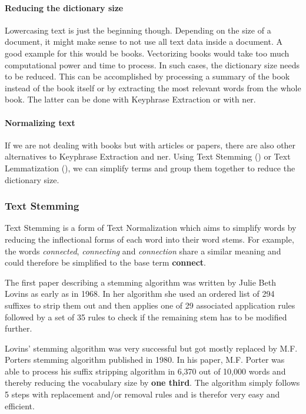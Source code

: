 \paragraph{Reducing the dictionary size}
Lowercasing text is just the beginning though.
Depending on the size of a document, it might make sense to not use all text data inside a document.
A good example for this would be books.
Vectorizing books would take too much computational power and time to process.
In such cases, the dictionary size needs to be reduced.
This can be accomplished by processing a summary of the book instead of the book itself
or by extracting the most relevant words from the whole book.
The latter can be done with Keyphrase Extraction or with \Gls{ner}.

\paragraph{Normalizing text}
If we are not dealing with books but with articles or papers,
there are also other alternatives to Keyphrase Extraction and \Gls{ner}.
Using Text Stemming ()
or Text Lemmatization (),
we can simplify terms and group them together to reduce the dictionary size.

\subsubsection{Text Stemming}
\label{subsubsec:3_text_stemming}

Text Stemming is a form of Text Normalization which aims to simplify words
by reducing the inflectional forms of each word into their word stems.
For example, the words \textit{connected}, \textit{connecting} and \textit{connection} share a similar meaning and could
therefore be simplified to the base term \textbf{connect}.

The first paper describing a stemming algorithm was written by Julie Beth Lovins\cite{LovinsStemmer}
as early as in 1968.
In her algorithm she used an ordered list of 294 suffixes to strip them out and then applies one of
29 associated application rules followed by a set of 35 rules to check if the remaining stem has to be
modified further.

Lovins' stemming algorithm was very successful but got mostly replaced by
M.F. Porters stemming algorithm\cite{PorterStemmerAlgorithm} published in 1980.
In his paper, M.F. Porter was able to process his suffix stripping algorithm in 6,370 out of 10,000 words and thereby
reducing the vocabulary size by \textbf{one third}.
The algorithm simply follows 5 steps with replacement and/or removal rules and is therefor very easy and efficient.


